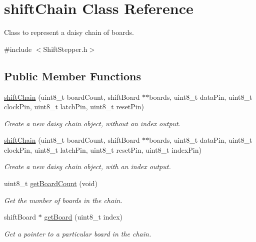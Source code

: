 \hypertarget{classshift_chain}{
\section{shiftChain Class Reference}
\label{classshift_chain}
}


Class to represent a daisy chain of boards.  




{\ttfamily \#include $<$ShiftStepper.h$>$}

\subsection*{Public Member Functions}
\begin{DoxyCompactItemize}
\item 
\hyperlink{classshift_chain_a195e5184202ba7408c5d4e5c9a568942}{shiftChain} (uint8\_\-t boardCount, shiftBoard $\ast$$\ast$boards, uint8\_\-t dataPin, uint8\_\-t clockPin, uint8\_\-t latchPin, uint8\_\-t resetPin)
\begin{DoxyCompactList}\small\item\em Create a new daisy chain object, without an index output. \item\end{DoxyCompactList}\item 
\hyperlink{classshift_chain_a18e8f5846d6fcece74e38051ce953467}{shiftChain} (uint8\_\-t boardCount, shiftBoard $\ast$$\ast$boards, uint8\_\-t dataPin, uint8\_\-t clockPin, uint8\_\-t latchPin, uint8\_\-t resetPin, uint8\_\-t indexPin)
\begin{DoxyCompactList}\small\item\em Create a new daisy chain object, with an index output. \item\end{DoxyCompactList}\item 
uint8\_\-t \hyperlink{classshift_chain_a580a9110d442bcf5c251ad2618b7943d}{getBoardCount} (void)
\begin{DoxyCompactList}\small\item\em Get the number of boards in the chain. \item\end{DoxyCompactList}\item 
shiftBoard $\ast$ \hyperlink{classshift_chain_a625ee1a0a7dcf77c5895391a58667267}{getBoard} (uint8\_\-t index)
\begin{DoxyCompactList}\small\item\em Get a pointer to a particular board in the chain. \item\end{DoxyCompactList}\item 

\end{DoxyCompactItemize}

